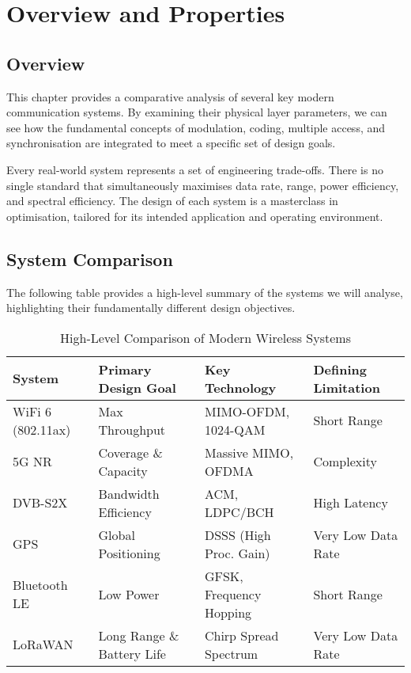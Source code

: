 \section{Overview and Properties}

\subsection{Overview}

This chapter provides a comparative analysis of several key modern communication systems. By examining their physical layer parameters, we can see how the fundamental concepts of modulation, coding, multiple access, and synchronisation are integrated to meet a specific set of design goals.

\begin{keyconcept}
    Every real-world system represents a set of engineering trade-offs. There is no single standard that simultaneously maximises data rate, range, power efficiency, and spectral efficiency. The design of each system is a masterclass in optimisation, tailored for its intended application and operating environment.
\end{keyconcept}


\subsection{System Comparison}

The following table provides a high-level summary of the systems we will analyse, highlighting their fundamentally different design objectives.

\begin{table}[H]
    \centering
    \caption{High-Level Comparison of Modern Wireless Systems}
    \label{tab:system-comparison}
    \begin{tabularx}{\textwidth}{@{}lXXX@{}}
        \toprule
        \tableheaderfont System & \tableheaderfont Primary Design Goal & \tableheaderfont Key Technology & \tableheaderfont Defining Limitation \\
        \midrule
        WiFi 6 (802.11ax) & Max Throughput & MIMO-OFDM, 1024-QAM & Short Range \\
        5G NR & Coverage \& Capacity & Massive MIMO, OFDMA & Complexity \\
        DVB-S2X & Bandwidth Efficiency & ACM, LDPC/BCH & High Latency \\
        GPS & Global Positioning & DSSS (High Proc. Gain) & Very Low Data Rate \\
        Bluetooth LE & Low Power & GFSK, Frequency Hopping & Short Range \\
        LoRaWAN & Long Range \& Battery Life & Chirp Spread Spectrum & Very Low Data Rate \\
        \bottomrule
    \end{tabularx}
\end{table}


